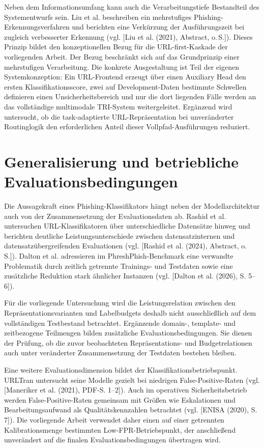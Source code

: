 Neben dem Informationsumfang kann auch die Verarbeitungstiefe Bestandteil des
Systementwurfs sein. Liu et al. beschreiben ein mehrstufiges
Phishing-Erkennungsverfahren und berichten eine Verkürzung der Ausführungszeit
bei zugleich verbesserter Erkennung
(vgl. [Liu et al. (2021), Abstract, o.\,S.]). Dieses Prinzip bildet den konzeptionellen
Bezug für die URL-first-Kaskade der vorliegenden Arbeit. Der Bezug beschränkt sich auf
das Grundprinzip einer mehrstufigen Verarbeitung. Die konkrete Ausgestaltung ist Teil der
eigenen Systemkonzeption: Ein URL-Frontend erzeugt über einen Auxiliary Head den ersten
Klassifikationsscore, zwei auf Development-Daten bestimmte Schwellen definieren einen
Unsicherheitsbereich und nur die dort liegenden Fälle werden an das vollständige
multimodale TRI-System weitergeleitet. Ergänzend wird untersucht, ob die task-adaptierte
URL-Repräsentation bei unveränderter Routinglogik den erforderlichen Anteil dieser
Vollpfad-Ausführungen reduziert.

\section{Generalisierung und betriebliche Evaluationsbedingungen}

Die Aussagekraft eines Phishing-Klassifikators hängt neben der Modellarchitektur auch
von der Zusammensetzung der Evaluationsdaten ab. Rashid et al. untersuchen
URL-Klassifikatoren über unterschiedliche Datensätze hinweg und berichten deutliche
Leistungsunterschiede zwischen datensatzinternen und datensatzübergreifenden
Evaluationen (vgl. [Rashid et al. (2024), Abstract, o.\,S.]). Dalton et al. adressieren im
PhreshPhish-Benchmark eine verwandte Problematik durch zeitlich getrennte Trainings-
und Testdaten sowie eine zusätzliche Reduktion stark ähnlicher Instanzen
(vgl. [Dalton et al. (2026), S. 5--6]).

Für die vorliegende Untersuchung wird die Leistungsrelation zwischen den
Repräsentationsvarianten und Labelbudgets deshalb nicht ausschließlich auf dem
vollständigen Testbestand betrachtet. Ergänzende domain-, template- und zeitbezogene
Teilmengen bilden zusätzliche Evaluationsbedingungen. Sie dienen der Prüfung, ob die
zuvor beobachteten Repräsentations- und Budgetrelationen auch unter veränderter
Zusammensetzung der Testdaten bestehen bleiben.

Eine weitere Evaluationsdimension bildet der Klassifikationsbetriebspunkt. URLTran
untersucht seine Modelle gezielt bei niedrigen False-Positive-Raten
(vgl. [Maneriker et al. (2021), PDF-S. 1--2]). Auch im operativen Sicherheitsbetrieb
werden False-Positive-Raten gemeinsam mit Größen wie Eskalationen und
Bearbeitungsaufwand als Qualitätskennzahlen betrachtet
(vgl. [ENISA (2020), S. 7]). Die vorliegende Arbeit verwendet daher einen auf einer
getrennten Kalibrationsmenge bestimmten Low-FPR-Betriebspunkt, der anschließend
unverändert auf die finalen Evaluationsbedingungen übertragen wird.

